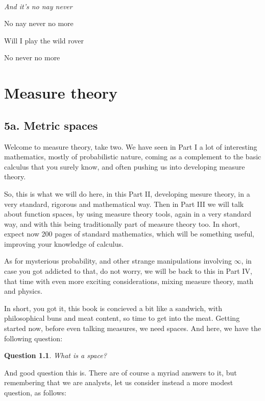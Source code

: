 \documentclass[12pt]{amsbook}
\newtheorem{question}[theorem]{Question}
\begin{document}
\ \vskip50mm

\begin{center}
{\em And it's no nay never

No nay never no more

Will I play the wild rover

No never no more}
\end{center}

\chapter{Measure theory}

\section*{5a. Metric spaces}

Welcome to measure theory, take two. We have seen in Part I a lot of interesting mathematics, mostly of probabilistic nature, coming as a complement to the basic calculus that you surely know, and often pushing us into developing measure theory.

\bigskip

So, this is what we will do here, in this Part II, developing mesure theory, in a very standard, rigorous and mathematical way. Then in Part III we will talk about function spaces, by using measure theory tools, again in a very standard way, and with this being traditionally part of measure theory too. In short, expect now 200 pages of standard mathematics, which will be something useful, improving your knowledge of calculus.

\bigskip

As for mysterious probability, and other strange manipulations involving $\infty$, in case you got addicted to that, do not worry, we will be back to this in Part IV, that time with even more exciting considerations, mixing measure theory, math and physics.

\bigskip

In short, you got it, this book is concieved a bit like a sandwich, with philosophical buns and meat content, so time to get into the meat. Getting started now, before even talking measures, we need spaces. And here, we have the following question:

\begin{question}
What is a space?
\end{question}

And good question this is. There are of course a myriad answers to it, but remembering that we are analysts, let us consider instead a more modest question, as follows:
\end{document}
